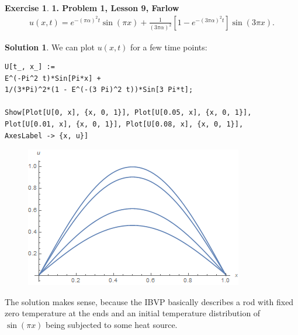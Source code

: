 \documentclass{article}
\theoremstyle{definition}
\newtheorem*{exer*}{Exercise}
\newtheorem*{sln*}{Solution}
\begin{document}
\begin{exer*}\textbf{1. Problem 1, Lesson 9, Farlow}
	\begin{align*}
	u(x,t) = e^{-(\pi\alpha)^2t}\sin(\pi x) + \frac{1}{(3\pi \alpha)^2}\left[1 - e^{-(3\pi \alpha)^2 t}\right]\sin(3\pi x).
	\end{align*}
	\begin{sln*}
		We can plot $u(x,t)$ for a few time points:
		\begin{lstlisting}
U[t_, x_] := 
E^(-Pi^2 t)*Sin[Pi*x] + 
1/(3*Pi)^2*(1 - E^(-(3 Pi)^2 t))*Sin[3 Pi*t];

Show[Plot[U[0, x], {x, 0, 1}], Plot[U[0.05, x], {x, 0, 1}],
Plot[U[0.01, x], {x, 0, 1}], Plot[U[0.08, x], {x, 0, 1}], 
AxesLabel -> {x, u}]
		\end{lstlisting}
		
		\begin{figure}[h!]
			\centering
			\includegraphics[scale=0.7]{pde4_1.png}
		\end{figure}
	
	The solution makes sense, because the IBVP basically describes a rod with fixed zero temperature at the ends and an initial temperature distribution of $\sin(\pi x)$ being subjected to some heat source. 
	\end{sln*}
\end{exer*}

\newpage
\end{document}
